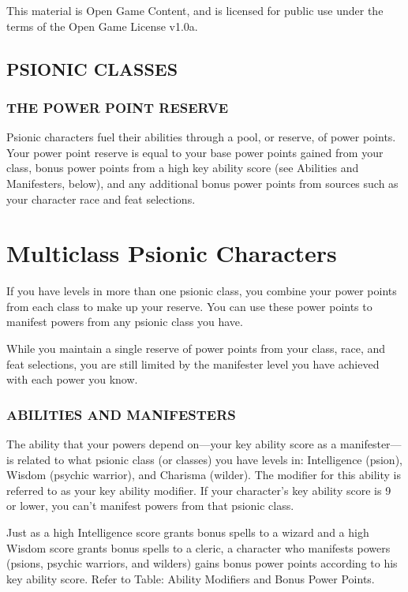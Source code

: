\documentclass{article}
\begin{document}
This material is Open Game Content, and is licensed for public use under the terms 
of the Open Game License v1.0a.

\subsection*{{\LARGE{}PSIONIC CLASSES}}

\vspace{12pt}
\subsubsection*{THE POWER POINT RESERVE}

Psionic characters fuel their abilities through a pool, or reserve, of power points. 
Your power point reserve is equal to your base power points gained from your class, 
bonus power points from a high key ability score (see Abilities and Manifesters, 
below), and any additional bonus power points from sources such as your character 
race and feat selections.

\section*{\textbf{Multiclass Psionic Characters}}

If you have levels in more than one psionic class, you combine your power points 
from each class to make up your reserve. You can use these power points to manifest 
powers from any psionic class you have. 

While you maintain a single reserve of power points from your class, race, and 
feat selections, you are still limited by the manifester level you have achieved 
with each power you know. 

\vspace{12pt}
\subsubsection*{ABILITIES AND MANIFESTERS}

The ability that your powers depend on---your key ability score as a manifester---is 
related to what psionic class (or classes) you have levels in: Intelligence (psion), 
Wisdom (psychic warrior), and Charisma (wilder). The modifier for this ability 
is referred to as your key ability modifier. If your character's key ability score 
is 9 or lower, you can't manifest powers from that psionic class.

Just as a high Intelligence score grants bonus spells to a wizard and a high Wisdom 
score grants bonus spells to a cleric, a character who manifests powers (psions, 
psychic warriors, and wilders) gains bonus power points according to his key ability 
score. Refer to Table: Ability Modifiers and Bonus Power Points.
\end{document}
